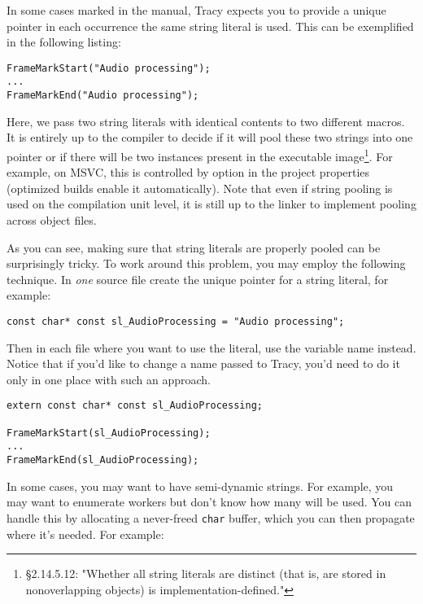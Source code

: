 \documentclass[hidelinks,titlepage,a4paper,twoside]{article}
\begin{document}
In some cases marked in the manual, Tracy expects you to provide a unique pointer in each occurrence the same string literal is used. This can be exemplified in the following listing:

\begin{lstlisting}
FrameMarkStart("Audio processing");
...
FrameMarkEnd("Audio processing");
\end{lstlisting}

Here, we pass two string literals with identical contents to two different macros. It is entirely up to the compiler to decide if it will pool these two strings into one pointer or if there will be two instances present in the executable image\footnote{\cite{ISO:2012:III} \S 2.14.5.12: "Whether all string literals are distinct (that is, are stored in nonoverlapping objects) is implementation-defined."}. For example, on MSVC, this is controlled by  option in the project properties (optimized builds enable it automatically). Note that even if string pooling is used on the compilation unit level, it is still up to the linker to implement pooling across object files.

As you can see, making sure that string literals are properly pooled can be surprisingly tricky. To work around this problem, you may employ the following technique. In \emph{one} source file create the unique pointer for a string literal, for example:

\begin{lstlisting}
const char* const sl_AudioProcessing = "Audio processing";
\end{lstlisting}

Then in each file where you want to use the literal, use the variable name instead. Notice that if you'd like to change a name passed to Tracy, you'd need to do it only in one place with such an approach.

\begin{lstlisting}
extern const char* const sl_AudioProcessing;

FrameMarkStart(sl_AudioProcessing);
...
FrameMarkEnd(sl_AudioProcessing);
\end{lstlisting}

In some cases, you may want to have semi-dynamic strings. For example, you may want to enumerate workers but don't know how many will be used. You can handle this by allocating a never-freed \texttt{char} buffer, which you can then propagate where it's needed. For example:
\end{document}
